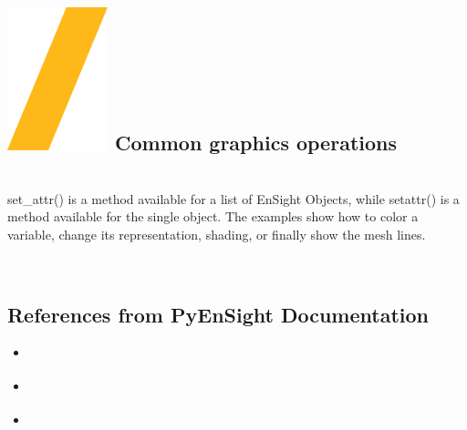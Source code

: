 \documentclass[9pt,landscape]{article}
\begin{document}
\begin{multicols}{3}

\section{{\includegraphics[height=\fontcharht\font`\S]{slash.png}  Common graphics operations}} \\

set\_attr() is a method available for a list of EnSight Objects, while setattr() is a method available for the single object. 
The examples show how to color a variable, change its representation, shading, or finally show the mesh lines.


\

\subsection{References from PyEnSight Documentation}
\begin{itemize}
\item \href{https://ensight.docs.pyansys.com/version/stable/getting_started/index.html}{\color{blue}{Getting Started}}  
\item \href{https://ensight.docs.pyansys.com/version/stable/class_documentation.html}{\color{blue}{EnSight API through PyEnSight}}
\item \href{https://ensight.docs.pyansys.com/version/stable/_examples/index.html}{\color{blue}{PyEnSight Examples}}
\end{itemize}
\end{multicols}
\end{document}
